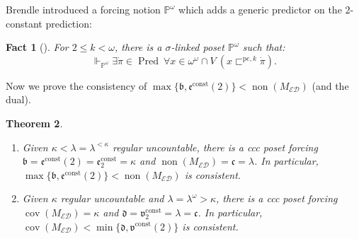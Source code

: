 \documentclass[a4paper,12pt]{amsart}
\newtheorem{thm}{Theorem}
\newtheorem{fac}[thm]{Fact}
\theoremstyle{definition}
\numberwithin{thm}{section}
\numberwithin{equation}{section}
\newcommand{\p}{\mathbb{P}}
\newcommand{\oo}{{\omega}^\omega}
\newcommand{\bb}{\mathfrak{b}}
\newcommand{\cc}{\mathfrak{c}}
\newcommand{\dd}{\mathfrak{d}}
\newcommand{\ee}{\mathfrak{e}}
\DeclareMathOperator{\non}{non}
\DeclareMathOperator{\cov}{cov}
\newcommand{\ed}{\mathcal{ED}}
\DeclareMathOperator{\Pred}{Pred}
\newcommand{\continuum}{\mathfrak{c}}
\newcommand{\eec}{\ee^{\mathrm{const}}}
\newcommand{\eect}{\ee^{\mathrm{const}}(2)}
\newcommand{\vv}{\mathfrak{v}}
\newcommand{\vvc}{\vv^{\mathrm{const}}}
\newcommand{\vvct}{\vv^{\mathrm{const}}(2)}
\newcommand{\pck}{\sqsubset^{\mathrm{pc},k}}
\begin{document}
    Brendle introduced a forcing notion $\p^\omega$ which adds a generic predictor on the $2$-constant prediction:
    
    \begin{fac}[{\cite{Bre03}}]\label{fac:p_omega}
        For $2\leq k<\omega$, there is a $\sigma$-linked poset $\p^\omega$ such that:
        \[
        \Vdash_{\p^\omega}\exists\dot{\pi}\in\Pred~\forall x\in\oo\cap V~ (x\pck\dot{\pi}).
        \]
    \end{fac}
    
    Now we prove the consistency of $\max\{\bb,\eect\}<\non(M_{\ed})$ (and the dual).
    
    \begin{thm}
    \label{thm:Con_max_b_eect_nonMED}\leavevmode
        \begin{enumerate}
            \item Given $\kappa<\lambda=\lambda^{<\kappa}$ regular uncountable, there is a ccc poset forcing $\bb=\eec(2)=\eec_2=\kappa$ and $\non(M_{\ed})=\cc=\lambda$.
            In particular, $\max\{\bb,\eect\}<\non(M_{\ed})$ is consistent.
            \item Given $\kappa$ regular uncountable and $\lambda=\lambda^{\omega}>\kappa$, there is a ccc poset forcing $\cov(M_{\ed})=\kappa$ and $\dd=\vvc_2=\lambda=\continuum$. In particular, $\cov(M_{\ed})<\min\{\dd,\vvct\}$ is consistent.
        \end{enumerate}
    \end{thm}
\end{document}
